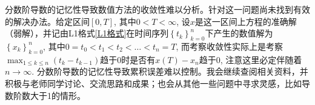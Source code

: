 分数阶导数的记忆性导致数值方法的收敛性难以分析。针对这一问题尚未找到有效的解决办法。给定区间$[0,T]$, 其中$0<T<\infty$, 设$x$是这一区间上方程的准确解（弱解），并记由L1格式\eqref{L1格式}在时间序列$\left\{t_k\right\}_{k=0}^n$下产生的数值解为$\left\{x_k\right\}_{k=0}^n$, 其中$0=t_0<t_1<t_2<\dots<t_n=T$, 而考察收敛性实际上是考察$\max_{1\leqslant k\leqslant n} \left(t_k-t_{k-1}\right)$趋于0时是否有$x(T)-x_n$趋于0, 注意这里必定伴随着$n\to \infty$. 分数阶导数的记忆性导致累积误差难以控制。我会继续查阅相关资料，并积极与老师同学讨论、交流思路和成果；也会从其他一些问题中寻求灵感，比如导数阶数大于1的情形。